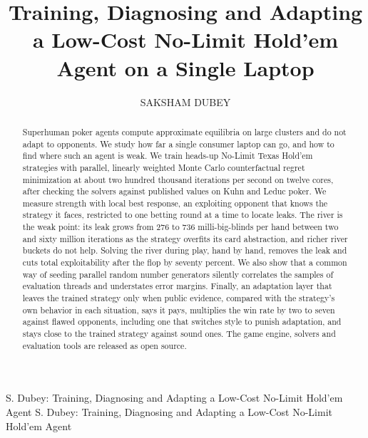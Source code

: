 \documentclass{ieeeaccess}
\newcommand{\pending}[1]{\textcolor{red}{[#1]}}
\begin{document}

\title{Training, Diagnosing and Adapting a Low-Cost No-Limit Hold'em Agent on a Single Laptop}

\author{\uppercase{Saksham Dubey}}

\address[1]{School of Computer Science and Engineering, Vellore Institute of Technology, Vellore, Tamil Nadu
632014, India (e-mail: saksham.dubey2024@vitstudent.ac.in)}

\tfootnote{\pending{Funding: none, or name the source.}}

\markboth
{S. Dubey: Training, Diagnosing and Adapting a Low-Cost No-Limit Hold'em Agent}
{S. Dubey: Training, Diagnosing and Adapting a Low-Cost No-Limit Hold'em Agent}


\begin{abstract}
Superhuman poker agents compute approximate equilibria on large clusters and do not adapt to
opponents. We study how far a single consumer laptop can go, and how to find
where such an agent is weak. We train heads-up No-Limit Texas Hold'em strategies with parallel,
linearly weighted Monte Carlo counterfactual regret minimization at about two hundred thousand
iterations per second on twelve cores, after checking the solvers against published values on
Kuhn and Leduc poker. We measure strength with local best response, an exploiting opponent that
knows the strategy it faces, restricted to one betting round at a time to locate leaks. The river is the weak point: its leak grows from 276 to 736 milli-big-blinds per
hand between two and sixty million iterations as the strategy overfits its card abstraction,
and richer river buckets do not help. Solving the river during play, hand by hand, removes the
leak and cuts total exploitability after the flop by seventy percent. We also show that a
common way of seeding parallel random number generators silently correlates the samples of
evaluation threads and understates error margins. Finally, an adaptation layer that leaves the
trained strategy only when public evidence, compared with the strategy's own behavior in each
situation, says it pays, multiplies the win rate by two to seven against flawed
opponents, including one that switches style to punish adaptation, and stays close to the
trained strategy against sound ones. The game engine, solvers and evaluation tools are released
as open source.
\end{abstract}
\end{document}
